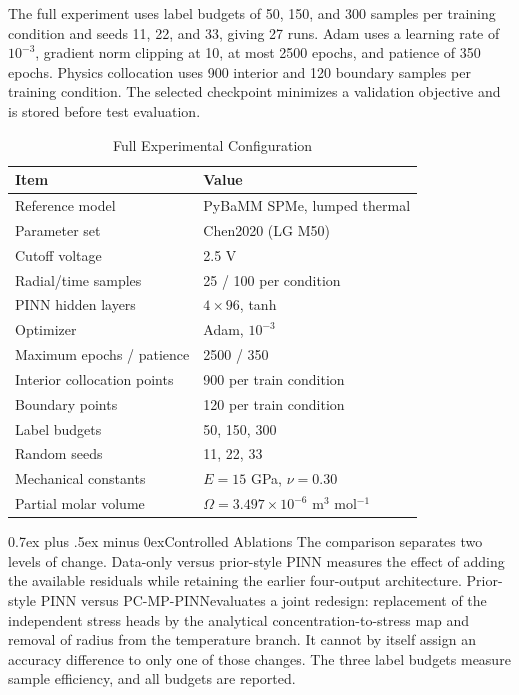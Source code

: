\documentclass[conference]{IEEEtran}
\makeatletter
\newcommand{\headingfont}{\rmfamily}
\def\subsection{\@startsection{subsection}{2}{\z@}{1.5ex plus 1.5ex minus 0.5ex}%
{0.7ex plus .5ex minus 0ex}{\normalfont\headingfont\normalsize\bfseries}}
\newcommand{\modelname}{PC-MP-PINN}
\makeatother
\begin{document}
The full experiment uses label budgets of 50, 150, and 300 samples per training condition and seeds 11, 22, and 33, giving 27 runs. Adam uses a learning rate of $10^{-3}$, gradient norm clipping at 10, at most 2500 epochs, and patience of 350 epochs. Physics collocation uses 900 interior and 120 boundary samples per training condition. The selected checkpoint minimizes a validation objective and is stored before test evaluation.

\begin{table}[t]
\centering
\caption{Full Experimental Configuration}
\label{tab:config}
\footnotesize
\setlength{\tabcolsep}{3.5pt}
\begin{tabular}{p{}p{}}
\toprule
Item & Value \\
\midrule
Reference model & PyBaMM SPMe, lumped thermal \\
Parameter set & Chen2020 (LG M50) \\
Cutoff voltage & 2.5 V \\
Radial/time samples & 25 / 100 per condition \\
PINN hidden layers & $4\times96$, tanh \\
Optimizer & Adam, $10^{-3}$ \\
Maximum epochs / patience & 2500 / 350 \\
Interior collocation points & 900 per train condition \\
Boundary points & 120 per train condition \\
Label budgets & 50, 150, 300 \\
Random seeds & 11, 22, 33 \\
Mechanical constants & $E=15$ GPa, $\nu=0.30$ \\
Partial molar volume & $\Omega=3.497\times10^{-6}$ m$^3$ mol$^{-1}$ \\
\bottomrule
\end{tabular}
\end{table}

\subsection{Controlled Ablations}
The comparison separates two levels of change. Data-only versus prior-style PINN measures the effect of adding the available residuals while retaining the earlier four-output architecture. Prior-style PINN versus \modelname evaluates a joint redesign: replacement of the independent stress heads by the analytical concentration-to-stress map and removal of radius from the temperature branch. It cannot by itself assign an accuracy difference to only one of those changes. The three label budgets measure sample efficiency, and all budgets are reported.
\end{document}
